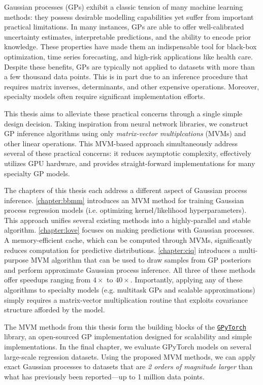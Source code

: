 Gaussian processes (GPs) exhibit a classic tension of many machine learning methods:
they possess desirable modelling capabilities yet suffer from important practical limitations.
In many instances, GPs are able to offer well-calibrated uncertainty estimates, interpretable predictions, and the ability to encode prior knowledge.
These properties have made them an indispensable tool for black-box optimization, time series forecasting, and high-risk applications like health care.
Despite these benefits, GPs are typically not applied to datasets with more than a few thousand data points.
This is in part due to an inference procedure that requires matrix inverses, determinants, and other expensive operations.
Moreover, specialty models often require significant implementation efforts.

This thesis aims to alleviate these practical concerns through a single simple design decision.
Taking inspiration from neural network libraries, we construct GP inference algorithms using only \emph{matrix-vector multiplcations} (MVMs) and other linear operations.
This MVM-based approach simultaneously address several of these practical concerns: it reduces asymptotic complexity, effectively utilizes GPU hardware, and provides straight-forward implementations for many specialty GP models.

The chapters of this thesis each address a different aspect of Gaussian process inference.
\cref{chapter:bbmm} introduces an MVM method for training Gaussian process regression models (i.e. optimizing kernel/likelihood hyperparameters).
This approach unifies several existing methods into a highly-parallel and stable algorithm.
\cref{chapter:love} focuses on making predictions with Gaussian processes.
A memory-efficient cache, which can be computed through MVMs, significantly reduces computation for predictive distributions.
\cref{chapter:ciq} introduces a multi-purpose MVM algorithm that can be used to draw samples from GP posteriors and perform approximate Gaussian process inference.
All three of these methods offer speedups ranging from $4\times$ to $40\times$.
Importantly, applying any of these algorithms to specialty models (e.g. multitask GPs and scalable approximations) simply requires a matrix-vector multiplication routine that exploits covariance structure afforded by the model.

The MVM methods from this thesis form the building blocks of the \href{http://github.com/cornellius-gp/gpytorch}{\tt GPyTorch} library, an open-sourced GP implementation designed for scalability and simple implementations.
In the final chapter, we evaluate GPyTorch models on several large-scale regression datasets.
Using the proposed MVM methods, we can apply exact Gaussian processes to datasets that are \emph{2 orders of magnitude larger} than what has previously been reported---up to 1 million data points.
